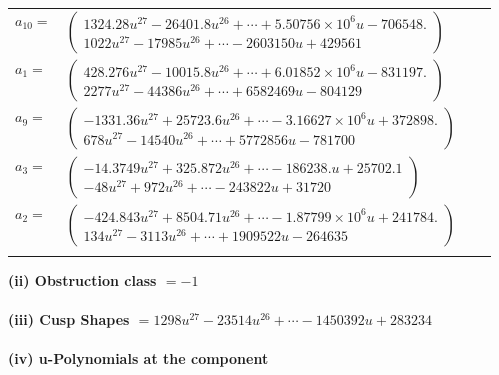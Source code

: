 \documentclass[1p]{elsarticle_modified}
\theoremstyle{definition}
\begin{document}
\begin{tabular}{m{7pt} m{180pt} m{7pt} m{180pt} }
\flushright $a_{10}=$&$\begin{pmatrix}1324.28 u^{27}-26401.8 u^{26}+\cdots+5.50756\times10^{6} u-706548.\\1022 u^{27}-17985 u^{26}+\cdots-2603150 u+429561\end{pmatrix}$ \\
\flushright $a_{1}=$&$\begin{pmatrix}428.276 u^{27}-10015.8 u^{26}+\cdots+6.01852\times10^{6} u-831197.\\2277 u^{27}-44386 u^{26}+\cdots+6582469 u-804129\end{pmatrix}$ \\
\flushright $a_{9}=$&$\begin{pmatrix}-1331.36 u^{27}+25723.6 u^{26}+\cdots-3.16627\times10^{6} u+372898.\\678 u^{27}-14540 u^{26}+\cdots+5772856 u-781700\end{pmatrix}$ \\
\flushright $a_{3}=$&$\begin{pmatrix}-14.3749 u^{27}+325.872 u^{26}+\cdots-186238. u+25702.1\\-48 u^{27}+972 u^{26}+\cdots-243822 u+31720\end{pmatrix}$ \\
\flushright $a_{2}=$&$\begin{pmatrix}-424.843 u^{27}+8504.71 u^{26}+\cdots-1.87799\times10^{6} u+241784.\\134 u^{27}-3113 u^{26}+\cdots+1909522 u-264635\end{pmatrix}$\\&\end{tabular}
\flushleft \textbf{(ii) Obstruction class $= -1$}\\~\\
\flushleft \textbf{(iii) Cusp Shapes $= 1298 u^{27}-23514 u^{26}+\cdots-1450392 u+283234$}\\~\\
\newpage\renewcommand{\arraystretch}{1}
\flushleft \textbf{(iv) u-Polynomials at the component}\newline \\
\end{document}
